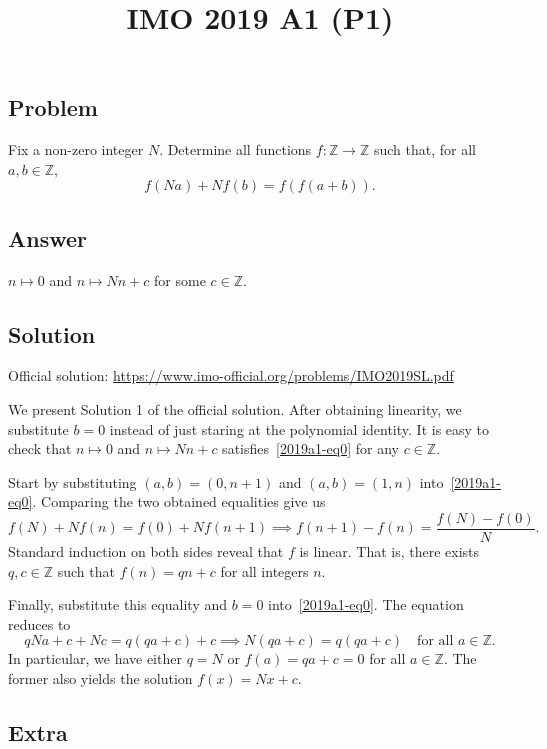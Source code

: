\documentclass{article}
\title{IMO 2019 A1 (P1)}
\author{}
\date{}
\newcommand{\Z}{\mathbb{Z}}
\begin{document}
\maketitle



\subsection*{Problem}

Fix a non-zero integer $N$.
Determine all functions $f : \Z \to \Z$ such that, for all $a, b \in \Z$,
\[ f(Na) + N f(b) = f(f(a + b)). \tag{*}\label{2019a1-eq0} \]



\subsection*{Answer}

$n \mapsto 0$ and $n \mapsto Nn + c$ for some $c \in \Z$.



\subsection*{Solution}

Official solution: \url{https://www.imo-official.org/problems/IMO2019SL.pdf}

We present Solution 1 of the official solution.
After obtaining linearity, we substitute $b = 0$ instead of just staring at the polynomial identity.
It is easy to check that $n \mapsto 0$ and $n \mapsto Nn + c$ satisfies~\eqref{2019a1-eq0} for any $c \in \Z$.

Start by substituting $(a, b) = (0, n + 1)$ and $(a, b) = (1, n)$ into~\eqref{2019a1-eq0}.
Comparing the two obtained equalities give us
\[ f(N) + N f(n) = f(0) + N f(n + 1) \implies f(n + 1) - f(n) = \frac{f(N) - f(0)}{N}. \]
Standard induction on both sides reveal that $f$ is linear.
That is, there exists $q, c \in \Z$ such that $f(n) = qn + c$ for all integers $n$.

Finally, substitute this equality and $b = 0$ into~\eqref{2019a1-eq0}.
The equation reduces to
\[ qNa + c + Nc = q(qa + c) + c \implies N(qa + c) = q(qa + c) \quad \text{for all } a \in \Z. \]
In particular, we have either $q = N$ or $f(a) = qa + c = 0$ for all $a \in \Z$.
The former also yields the solution $f(x) = Nx + c$.



\subsection*{Extra}
\end{document}
